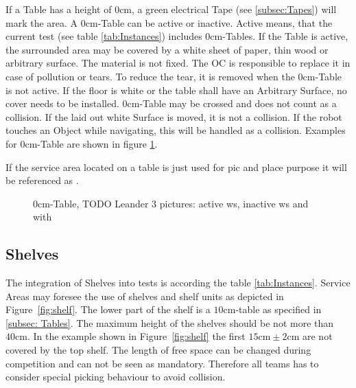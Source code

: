 If a Table has a height of $0\si{\centi\meter}$, a green electrical Tape (see \ref{subsec:Tapes}) will mark the area. A $0\si{\centi\meter}$-Table can be active or inactive. Active means, that the current test (see table \ref{tab:Instances}) includes $0\si{\centi\meter}$-Tables.
If the Table is active, the surrounded area may be covered by a white sheet of paper, thin wood or arbitrary surface. The material is not fixed.
The OC is responsible to replace it in case of pollution or tears. To reduce the tear, it is removed when the $0\si{\centi\meter}$-Table is not active. If the floor is white or the table shall have an Arbitrary Surface, no cover needs to be installed.
$0\si{\centi\meter}$-Table may be crossed and does not count as a collision. If the laid out white Surface is moved, it is not a collision.
If the robot touches an Object while navigating, this will be handled as a collision. Examples for $0\si{\centi\meter}$-Table are shown in figure \ref{fig:0cmws}.

If the service area located on a table is just used for pic and place purpose it will be referenced as . 

\begin{figure} [h!]
	\begin{center}
		\missingfigure[figwidth=6cm]{}	
	\end{center}
	\caption{$0\si{\centi\meter}$-Table, TODO Leander 3 pictures: active ws, inactive ws and with }
	\label{fig:0cmws}
\end{figure}

\subsection{Shelves}\label{sec:Shelves}

The integration of Shelves into tests is according the table \ref{tab:Instances}. Service Areas may foresee the use of shelves and shelf units as depicted in Figure~\ref{fig:shelf}. The lower part of the shelf is a $10\si{\centi\meter}$-table as specified in \ref{subsec: Tables}.
The maximum height of the shelves should be not more than $40\si{\centi\meter}$. In the example shown in Figure~\ref{fig:shelf} the first $15 \si{\centi\meter}\pm 2\si{\centi\meter} $ are not covered by the top shelf. The length of free space can be changed during competition and can not be seen as mandatory. Therefore all teams has to consider special picking behaviour to avoid collision.  

